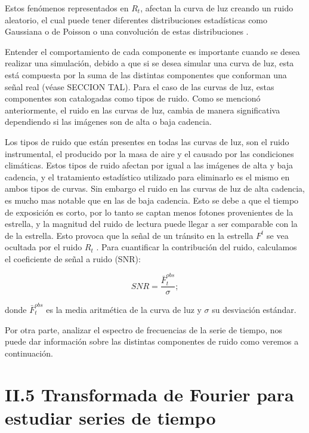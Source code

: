 Estos fenómenos representados en $R_{t}$, afectan la curva de luz creando un ruido aleatorio, el cual puede tener diferentes distribuciones estadísticas como Gaussiana o de Poisson o una convolución de estas distribuciones \cite{luisier2010image}.

Entender el comportamiento de cada componente es importante cuando se desea realizar una simulación, debido a que si se desea simular una curva de luz, esta está compuesta por la suma de las distintas componentes que conforman una señal real (véase SECCION TAL). Para el caso de las curvas de luz, estas componentes son catalogadas como tipos de ruido. Como se mencionó anteriormente, el ruido en las curvas de luz, cambia de manera significativa dependiendo si las imágenes son de alta o baja cadencia.

Los tipos de ruido que están presentes en todas las curvas de luz, son el ruido instrumental, el producido por la masa de aire y el causado por las condiciones climáticas. Estos tipos de ruido afectan por igual a las imágenes de alta y baja cadencia, y el tratamiento estadístico utilizado para eliminarlo es el mismo en ambos tipos de curvas. Sin embargo el ruido en las curvas de luz de alta cadencia, es mucho mas notable que en las de baja cadencia. Esto se debe a que el tiempo de exposición es corto, por lo tanto se captan menos fotones provenientes de la estrella, y la magnitud del ruido de lectura puede llegar a ser comparable con la de la estrella. Esto provoca que la señal de un tránsito en la estrella $F^{t}$  se vea ocultada por el ruido $R_{t}$ \cite{pont2006effect}. Para cuantificar la contribución del ruido, calculamos el coeficiente de señal a ruido (SNR):

\begin{equation}
  \displaystyle SNR=\dfrac{\bar{F}^{obs}_{t}}{\sigma};
\end{equation}

\noindent donde $\bar{F}^{obs}_{t}$ es la media aritmética de la curva de luz y $\sigma$ su desviación estándar.

Por otra parte, analizar el espectro de frecuencias de la serie de tiempo, nos puede dar información sobre las distintas componentes de ruido como veremos a continuación.

\section*{II.5 Transformada de Fourier para estudiar series de tiempo}

